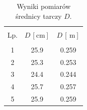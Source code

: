 \begin{table}[h]
\begin{center}
\renewcommand*{\tablename}{Tabela}
\caption{\small Wyniki pomiarów średnicy tarczy $D$.\vspace{0.15cm}
    \label{tab:srednica_tarczy}}
    {\small
    \begin{tabular}{c c c}
    \hline \vspace{-0.35cm} \\
      Lp. & $D\,[\mathrm{cm}]$ & $D\,[\, \mathrm{m}]$ \\ 
      \hline \vspace{-0.2cm} \\
     1 & 25.9 & 0.259 \\
     2 & 25.3 & 0.253 \\
     3 & 24.4 & 0.244 \\
     4 & 25.7 & 0.257 \\
     5 & 25.9 & 0.259 \\
    \hline
    \end{tabular}}
    \end{center}
\end{table}
